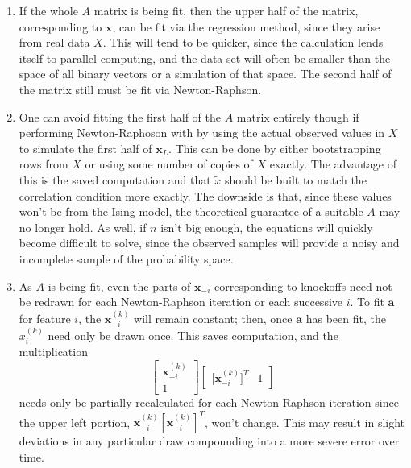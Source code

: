 \documentclass[11pt]{article}
\theoremstyle{definition}
\begin{document}
        \begin{enumerate}
            \item If the whole $A$ matrix is being fit, then the upper half of the matrix, corresponding to $\mathbf x$, can be fit via the regression method, since they arise from real data $X$. This will tend to be quicker, since the calculation lends itself to parallel computing, and the data set will often be smaller than the space of all binary vectors or a simulation of that space. The second half of the matrix still must be fit via Newton-Raphson.
            \item One can avoid fitting the first half of the $A$ matrix entirely though if performing Newton-Raphoson with by using the actual observed values in $X$ to simulate the first half of $\mathbf x_L$. This can be done by either bootstrapping rows from $X$ or using some number of copies of $X$ exactly. The advantage of this is the saved computation and that $\tilde x$ should be built to match the correlation condition more exactly. The downside is that, since these values won't be from the Ising model, the theoretical guarantee of a suitable $A$ may no longer hold. As well, if $n$ isn't big enough, the equations will quickly become difficult to solve, since the observed samples will provide a noisy and incomplete sample of the probability space.
            \item As $A$ is being fit, even the parts of $\mathbf x_{-i}$ corresponding to knockoffs need not be redrawn for each Newton-Raphson iteration or each successive $i$. To fit $\mathbf a$ for feature $i$, the $\mathbf x_{-i}^{(k)}$ will remain constant; then, once $\mathbf a$ has been fit, the $x_i^{(k)}$ need only be drawn once. This saves computation, and the multiplication
            \[ \left[\begin{array}{c} \mathbf x_{-i}^{(k)} \\ 1 \end{array}\right]\left[\begin{array}{cc} \mathbf [\mathbf x_{-i}^{(k)}]^T & 1 \end{array}\right] \]
                needs only be partially recalculated for each Newton-Raphson iteration since the upper left portion, $\mathbf x_{-i}^{(k)}[\mathbf{x}_{-i}^{(k)}]^T$, won't change. This may result in slight deviations in any particular draw compounding into a more severe error over time.

\end{enumerate}
\end{document}
